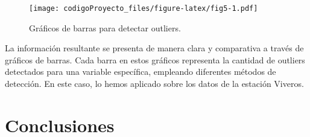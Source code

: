 \documentclass[
]{article}
\newenvironment{Shaded}{\begin{snugshade}}{\end{snugshade}}
\newcommand{\AttributeTok}[1]{\textcolor[rgb]{0.13,0.29,0.53}{#1}}
\newcommand{\ControlFlowTok}[1]{\textcolor[rgb]{0.13,0.29,0.53}{\textbf{#1}}}
\newcommand{\DecValTok}[1]{\textcolor[rgb]{0.00,0.00,0.81}{#1}}
\newcommand{\FunctionTok}[1]{\textcolor[rgb]{0.13,0.29,0.53}{\textbf{#1}}}
\newcommand{\NormalTok}[1]{#1}
\newcommand{\OtherTok}[1]{\textcolor[rgb]{0.56,0.35,0.01}{#1}}
\newcommand{\SpecialCharTok}[1]{\textcolor[rgb]{0.81,0.36,0.00}{\textbf{#1}}}
\newcommand{\StringTok}[1]{\textcolor[rgb]{0.31,0.60,0.02}{#1}}
\begin{document}
\begin{Shaded}
\end{Shaded}

\begin{figure}
\centering
\texttt{[image: codigoProyecto\_files/figure-latex/fig5-1.pdf]}
\caption{Gráficos de barras para detectar outliers.\label{fig:fig5}}
\end{figure}

La información resultante se presenta de manera clara y comparativa a
través de gráficos de barras. Cada barra en estos gráficos representa la
cantidad de outliers detectados para una variable específica, empleando
diferentes métodos de detección. En este caso, lo hemos aplicado sobre
los datos de la estación Viveros.

\hypertarget{conclusiones}{%
\section{Conclusiones}\label{conclusiones}}
\end{document}

